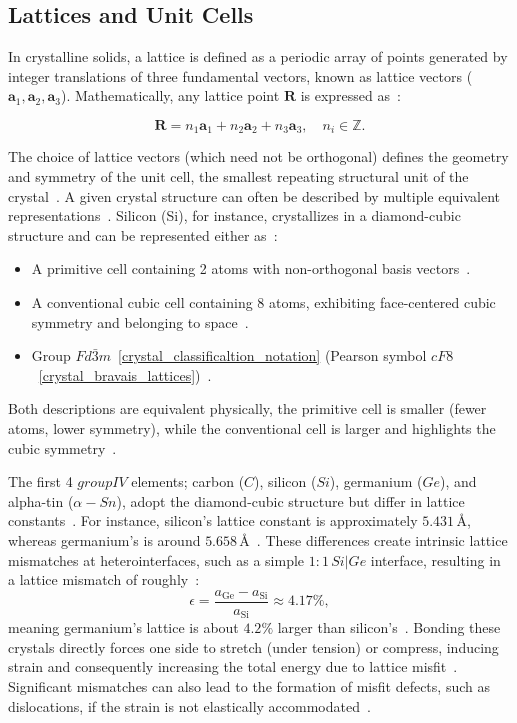\subsection*{Lattices and Unit Cells}

In crystalline solids, a lattice is defined as a periodic array of points generated by integer translations of three fundamental vectors, known as lattice vectors ($\mathbf{a}_1, \mathbf{a}_2, \mathbf{a}_3$). Mathematically, any lattice point $\mathbf{R}$ is expressed as~\cite{vasp_bulk}:

\begin{equation}
\mathbf{R} = n_1 \mathbf{a}_1 + n_2 \mathbf{a}_2 + n_3 \mathbf{a}_3, \quad n_i \in \mathbb{Z}.
\end{equation}

The choice of lattice vectors (which need not be orthogonal) defines the geometry and symmetry of the unit cell, the smallest repeating structural unit of the crystal~\nocite{}.
A given crystal structure can often be described by multiple equivalent representations~\nocite{}.
Silicon (Si), for instance, crystallizes in a diamond-cubic structure and can be represented either as~\nocite{}:

\begin{itemize}
    \item A primitive cell containing 2 atoms with non-orthogonal basis vectors~\nocite{}.
    \item A conventional cubic cell containing 8 atoms, exhibiting face-centered cubic symmetry and belonging to space~\nocite{}.
    \item Group $Fd\bar{3}m$~\ref{crystal_classificaltion_notation} (Pearson symbol $cF8$~\ref{crystal_bravais_lattices})~\nocite{}.
\end{itemize}

Both descriptions are equivalent physically, the primitive cell is smaller (fewer atoms, lower symmetry), while the conventional cell is larger and highlights the cubic symmetry~\nocite{}.

\newpage The first 4 $group IV$ elements; carbon ($C$), silicon ($Si$), germanium ($Ge$), and alpha-tin ($\alpha-Sn$), adopt the diamond-cubic structure but differ in lattice constants~\nocite{}.
For instance, silicon's lattice constant is approximately $5.431\,\text{\AA{}}$, whereas germanium's is around $5.658\,\text{\AA{}}$~\nocite{}.
These differences create intrinsic lattice mismatches at heterointerfaces, such as a simple $1{:}1\,Si|Ge$ interface, resulting in a lattice mismatch of roughly~\nocite{}:
\begin{equation}
    \epsilon = \frac{a_{\mathrm{Ge}} - a_{\mathrm{Si}}}{a_{\mathrm{Si}}} \approx 4.17\%,
\end{equation}
meaning germanium's lattice is about $4.2\%$ larger than silicon's~\nocite{}.
Bonding these crystals directly forces one side to stretch (under tension) or compress, inducing strain and consequently increasing the total energy due to lattice misfit~\nocite{}.
Significant mismatches can also lead to the formation of misfit defects, such as dislocations, if the strain is not elastically accommodated~\cite{artemis_paper}.

